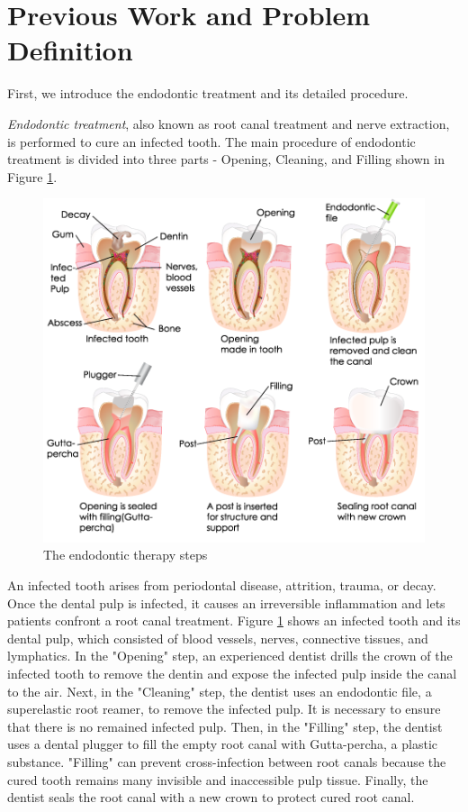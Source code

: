 \section{Previous Work and Problem Definition}
\hspace*{6mm}First, we introduce the endodontic treatment and its detailed procedure.
\par
\textit{Endodontic treatment}, also known as root canal treatment and nerve extraction, is performed to cure an infected tooth. The main procedure of endodontic treatment is divided into three parts - Opening, Cleaning, and Filling shown in  Figure \ref{fig:endo-procedure}.
\begin{figure}[htbp]
\begin{center}
\includegraphics[width=0.7\linewidth]{Images/endo-procedure.png}
\caption{
The endodontic therapy steps
}\label{fig:endo-procedure}
\end{center}
\end{figure}
\par
An infected tooth arises from periodontal disease, attrition, trauma, or decay. Once the dental pulp is infected, it causes an irreversible inflammation and lets patients confront a root canal treatment. Figure \ref{fig:endo-procedure} shows an infected tooth and its dental pulp, which consisted of blood vessels, nerves, connective tissues, and lymphatics. In the "Opening" step, an experienced dentist drills the crown of the infected tooth to remove the dentin and expose the infected pulp inside the canal to the air. Next, in the "Cleaning" step, the dentist uses an endodontic file, a superelastic root reamer, to remove the infected pulp. It is necessary to ensure that there is no remained infected pulp. Then, in the "Filling" step, the dentist uses a dental plugger to fill the empty root canal with Gutta-percha, a plastic substance. "Filling" can prevent cross-infection between root canals because the cured tooth remains many invisible and inaccessible pulp tissue. Finally, the dentist seals the root canal with a new crown to protect cured root canal. 
